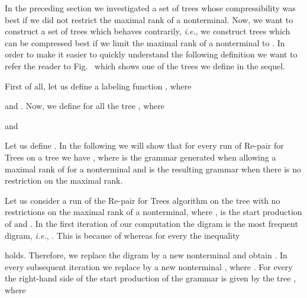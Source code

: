 \documentclass[12pt]{llncs}
\newcommand{\tp}{digram\xspace}
\newcommand{\hairsp}{\hspace{1pt}}\newcommand{\TODO}{\textcolor{red}{\bf TODO!}\xspace}
\newcommand{\ie}{\mbox{\textit{i.\hairsp{}e.}}\xspace}
\begin{document}
In the preceding section we investigated a set of trees whose compressibility was best if we did not restrict the maximal rank of a nonterminal. Now, we want to construct a set of trees which behaves contrarily, \ie, we construct trees which can be compressed best if we limit the maximal rank of a nonterminal to . In order to make it easier to quickly understand the following definition we want to refer the reader to Fig.~ which shows one of the trees we define in the sequel.

First of all, let us define a labeling function , where

and . Now, we define for all  the tree , where

and

Let us define . In the following we will show that for every run of Re-pair for Trees on a tree  we have , where  is the grammar generated when allowing a maximal rank of  for a nonterminal and  is the resulting grammar when there is no restriction on the maximal rank.

Let us consider a run  of the Re-pair for Trees algorithm on the tree  with no restrictions on the maximal rank of a nonterminal, where ,  is the start production of  and . In the first iteration of our computation the \tp  is the most frequent \tp, \ie, . This is because of  whereas for every  the inequality

holds. Therefore, we replace the \tp  by a new nonterminal  and obtain . In every subsequent iteration  we replace  by a new nonterminal , where . For every  the right-hand side of the start production of the grammar  is given by the tree , where
\end{document}
